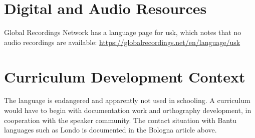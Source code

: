 \documentclass[12pt]{article}
\begin{document}
\section{Digital and Audio Resources}
Global Recordings Network has a language page for usk, which notes that no audio recordings are available: \url{https://globalrecordings.net/en/language/usk}

\section{Curriculum Development Context}
The language is endangered and apparently not used in schooling. A curriculum would have to begin with documentation work and orthography development, in cooperation with the speaker community. The contact situation with Bantu languages such as Londo is documented in the Bologna article above.
\end{document}
